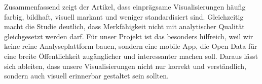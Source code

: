 \smallskip
\noindent
Zusammenfassend zeigt der Artikel, dass einprägsame Visualisierungen häufig farbig, bildhaft, visuell markant und weniger standardisiert sind. Gleichzeitig macht die Studie deutlich, dass Merkfähigkeit nicht mit analytischer Qualität gleichgesetzt werden darf. Für unser Projekt ist das besonders hilfreich, weil wir keine reine Analyseplattform bauen, sondern eine mobile App, die Open Data für eine breite Öffentlichkeit zugänglicher und interessanter machen soll. Daraus lässt sich ableiten, dass unsere Visualisierungen nicht nur korrekt und verständlich, sondern auch visuell erinnerbar gestaltet sein sollten.


